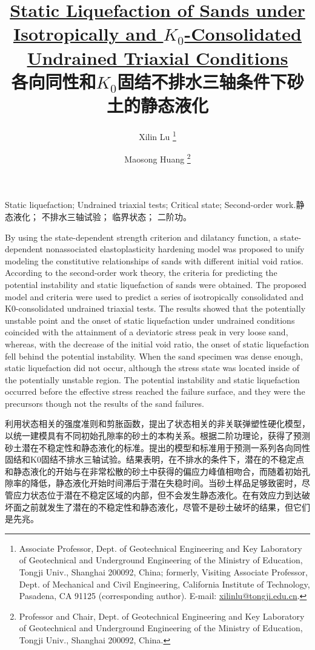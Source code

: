 \documentclass{bilidoc}
\title{\textbf{\href{https://doi.org/10.1061/(ASCE)GT.1943-5606.0001206}{Static Liquefaction of Sands under Isotropically and $K_0$-Consolidated Undrained Triaxial Conditions }\\各向同性和$K_0$固结不排水三轴条件下砂土的静态液化}}
\author{Xilin Lu \thanks{
    Associate Professor, Dept. of Geotechnical Engineering and Key Laboratory of Geotechnical and Underground Engineering of the Ministry of Education, Tongji Univ., Shanghai 200092, China; formerly, Visiting Associate Professor, Dept. of Mechanical and Civil Engineering, California Institute of Technology, Pasadena, CA 91125 (corresponding author). E-mail: \url{xilinlu@tongji.edu.cn}.
} \and Maosong Huang \thanks{
    Professor and Chair, Dept. of Geotechnical Engineering and Key Laboratory of Geotechnical and Underground Engineering of the Ministry of Education, Tongji Univ., Shanghai 200092, China.
}}
\date{}
\begin{document}
\maketitle

\begin{Abstract}{Static liquefaction; Undrained triaxial tests; Critical state; Second-order work.}{静态液化； 不排水三轴试验； 临界状态； 二阶功。}

    By using the state-dependent strength criterion and dilatancy function, a state-dependent nonassociated elastoplasticity hardening model was proposed to unify modeling the constitutive relationships of sands with different initial void ratios. According to the second-order work theory, the criteria for predicting the potential instability and static liquefaction of sands were obtained. The proposed model and criteria were used to predict a series of isotropically consolidated and K0-consolidated undrained triaxial tests. The results showed that the potentially unstable point and the onset of static liquefaction under undrained conditions coincided with the attainment of a deviatoric stress peak in very loose sand, whereas, with the decrease of the initial void ratio, the onset of static liquefaction fell behind the potential instability. When the sand specimen was dense enough, static liquefaction did not occur, although the stress state was located inside of the potentially unstable region. The potential instability and static liquefaction occurred before the effective stress reached the failure surface, and they were the precursors though not the results of the sand failures.

    \switchcolumn

    利用状态相关的强度准则和剪胀函数，提出了状态相关的非关联弹塑性硬化模型，以统一建模具有不同初始孔隙率的砂土的本构关系。根据二阶功理论，获得了预测砂土潜在不稳定性和静态液化的标准。提出的模型和标准用于预测一系列各向同性固结和K0固结不排水三轴试验。结果表明，在不排水的条件下，潜在的不稳定点和静态液化的开始与在非常松散的砂土中获得的偏应力峰值相吻合，而随着初始孔隙率的降低，静态液化开始时间滞后于潜在失稳时间。当砂土样品足够致密时，尽管应力状态位于潜在不稳定区域的内部，但不会发生静态液化。在有效应力到达破坏面之前就发生了潜在的不稳定性和静态液化，尽管不是砂土破坏的结果，但它们是先兆。
    
\end{Abstract}















    
\end{document}
